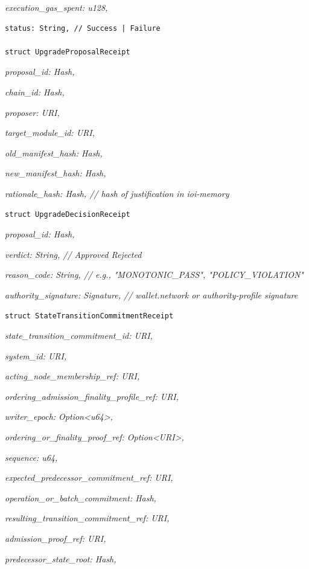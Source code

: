 \documentclass[
  11pt,
]{article}
\begin{document}
\emph{execution\_gas\_spent: u128,}

\begin{lstlisting}[language=rustioi]
status: String, // Success | Failure

struct UpgradeProposalReceipt
\end{lstlisting}
\emph{proposal\_id: Hash,}

\emph{chain\_id: Hash,}

\emph{proposer: URI,}

\emph{target\_module\_id: URI,}

\emph{old\_manifest\_hash: Hash,}

\emph{new\_manifest\_hash: Hash,}

\emph{rationale\_hash: Hash, // hash of justification in ioi-memory}

\begin{lstlisting}[language=rustioi]
struct UpgradeDecisionReceipt
\end{lstlisting}
\emph{proposal\_id: Hash,}

\emph{verdict: String, // Approved \textbar{} Rejected}

\emph{reason\_code: String, // e.g., "MONOTONIC\_PASS",
"POLICY\_VIOLATION"}

\emph{authority\_signature: Signature, // wallet.network or authority-profile
signature}

\begin{lstlisting}[language=rustioi]
struct StateTransitionCommitmentReceipt
\end{lstlisting}
\emph{state\_transition\_commitment\_id: URI,}

\emph{system\_id: URI,}

\emph{acting\_node\_membership\_ref: URI,}

\emph{ordering\_admission\_finality\_profile\_ref: URI,}

\emph{writer\_epoch: Option\textless u64\textgreater,}

\emph{ordering\_or\_finality\_proof\_ref: Option\textless URI\textgreater,}

\emph{sequence: u64,}

\emph{expected\_predecessor\_commitment\_ref: URI,}

\emph{operation\_or\_batch\_commitment: Hash,}

\emph{resulting\_transition\_commitment\_ref: URI,}

\emph{admission\_proof\_ref: URI,}

\emph{predecessor\_state\_root: Hash,}
\end{document}
